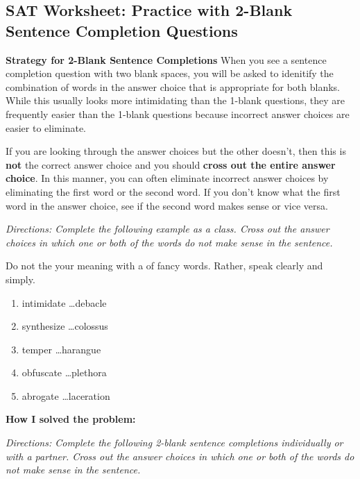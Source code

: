 \subsection{SAT Worksheet: Practice with 2-Blank Sentence Completion Questions}
 
\textbf{Strategy for 2-Blank Sentence Completions}
When you see a sentence completion question with two blank spaces, you will be asked to idenitify the combination of words in the answer choice that is appropriate for both blanks. While this usually looks more intimidating than the 1-blank questions, they are frequently easier than the 1-blank questions because incorrect answer choices are easier to eliminate.  


If you are looking through the answer choices but the other doesn't, then this is \textbf{not} the correct answer choice and you should \textbf{cross out the entire answer choice}. In this manner, you can often eliminate incorrect answer choices by eliminating the first word or the second word. If you don't know what the first word in the answer choice, see if the second word makes sense or vice versa. 

\bigskip
\textit{Directions: Complete the following example as a class. Cross out the answer choices in which one or both of the words do not make sense in the sentence.}

Do not \underline{\hspace{2in}} the your meaning with a \underline{\hspace{2in}} of fancy words. Rather, speak clearly and simply. 

\begin{enumerate} [label=(\Alph*)]
\item intimidate \ldots debacle
\item synthesize \ldots colossus
\item temper \ldots harangue
\item obfuscate \ldots plethora
\item abrogate \ldots laceration
\end{enumerate} 

\large{\textbf{How I solved the problem:}} \hrulefill


\bigskip
\textit{Directions: Complete the following 2-blank sentence completions individually or with a partner. Cross out the answer choices in which one or both of the words do not make sense in the sentence.}


